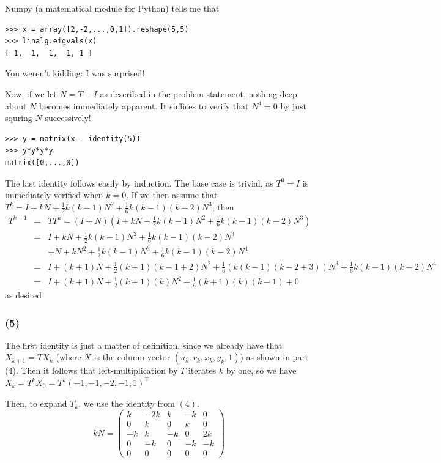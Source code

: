\documentclass{article}
\begin{document}
Numpy (a matematical module for Python) tells me that 
\begin{verbatim}
>>> x = array([2,-2,...,0,1]).reshape(5,5)
>>> linalg.eigvals(x)
[ 1,  1,  1,  1, 1 ]
\end{verbatim}
You weren't kidding: I was surprised!

Now, if we let $N = T - I$ as described in the problem statement, nothing deep about $N$ becomes immediately apparent. It suffices to verify that $N^4 = 0$ by just squring $N$ successively!

\begin{verbatim}
>>> y = matrix(x - identity(5))
>>> y*y*y*y
matrix([0,...,0])
\end{verbatim}

The last identity follows easily by induction. The base case is trivial, as $T^0 = I$ is immediately verified when $k = 0$.
If we then assume that $T^k = I + kN + \frac{1}{2}k(k-1)N^2 + \frac{1}{6}k(k-1)(k-2)N^3$, then
\begin{eqnarray*}
  T^{k+1} &=&  TT^k = (I + N)(I + kN + \frac{1}{2}k(k-1)N^2 + \frac{1}{6}k(k-1)(k-2)N^3)\\
  &=&  I + kN + \frac{1}{2}k(k-1)N^2 + \frac{1}{6}k(k-1)(k-2)N^3 \\
  && + N + kN^2 + \frac{1}{2}k(k-1)N^3 + \frac{1}{6}k(k-1)(k-2)N^4 \\
  &=& I + (k+1)N + \frac{1}{2}(k+1)(k-1 + 2)N^2 + \frac{1}{6}(k(k-1)(k - 2 + 3))N^3 + \frac{1}{6}k(k-1)(k-2)N^4\\
  &=& I + (k+1)N + \frac{1}{2}(k+1)(k)N^2 + \frac{1}{6}(k+1)(k)(k-1) + 0
\end{eqnarray*}
as desired

\subsubsection{(5)}
The first identity is just a matter of definition, since we already have that $X_{k+1} = T X_{k}$ (where $X$ is the column vector $(u_k, v_k, x_k, y_k, 1)$) as shown in part (4).
Then it follows that left-multiplication by $T$ iterates $k$ by one, so we have $X_{k} = T^k X_0 = T^k (-1,-1,-2,-1,1)^\top$

Then, to expand $T_k$, we use the identity from $(4)$.
\[
kN = \left( 
\begin{array}{ccccc}
k & -2k & k & -k & 0 \\
0 &   k & 0 &  k & 0 \\
-k&   k & -k&  0 & 2k \\
0 &  -k & 0 & -k & -k \\
0 & 0 & 0 & 0 & 0
\end{array}
\right)
\]
\end{document}
